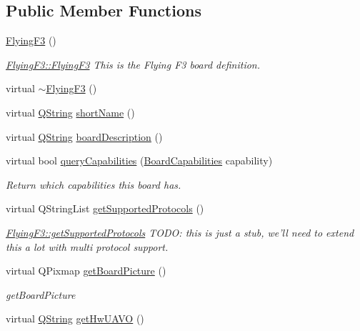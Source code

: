 \subsection*{\-Public \-Member \-Functions}
\begin{DoxyCompactItemize}
\item 
\hyperlink{group___boards___stm_ga9b44241cce2e1f0737c9fef2eace273b}{\-Flying\-F3} ()
\begin{DoxyCompactList}\small\item\em \hyperlink{group___boards___stm_ga9b44241cce2e1f0737c9fef2eace273b}{\-Flying\-F3\-::\-Flying\-F3} \-This is the \-Flying \-F3 board definition. \end{DoxyCompactList}\item 
virtual \hyperlink{group___boards___stm_ga23437724f5332cc76950a41249c6d968}{$\sim$\-Flying\-F3} ()
\item 
virtual \hyperlink{group___u_a_v_objects_plugin_gab9d252f49c333c94a72f97ce3105a32d}{\-Q\-String} \hyperlink{group___boards___stm_ga968d0cdefdfe42c8f2dfbc4cafca72f2}{short\-Name} ()
\item 
virtual \hyperlink{group___u_a_v_objects_plugin_gab9d252f49c333c94a72f97ce3105a32d}{\-Q\-String} \hyperlink{group___boards___stm_ga76b7c5c83fb46e122a100ae0ef5fae8f}{board\-Description} ()
\item 
virtual bool \hyperlink{group___boards___stm_ga92cb3b23d790b1b3aadab14c830412f3}{query\-Capabilities} (\hyperlink{group___core_plugin_ga01b09218f2a13aaeee6db007ac6bd967}{\-Board\-Capabilities} capability)
\begin{DoxyCompactList}\small\item\em \-Return which capabilities this board has. \end{DoxyCompactList}\item 
virtual \-Q\-String\-List \hyperlink{group___boards___stm_ga96db192be19ed6a7af49c8668cf4ff36}{get\-Supported\-Protocols} ()
\begin{DoxyCompactList}\small\item\em \hyperlink{group___boards___stm_ga96db192be19ed6a7af49c8668cf4ff36}{\-Flying\-F3\-::get\-Supported\-Protocols} \-T\-O\-D\-O\-: this is just a stub, we'll need to extend this a lot with multi protocol support. \end{DoxyCompactList}\item 
virtual \-Q\-Pixmap \hyperlink{group___boards___stm_ga7639046444dbf061bc2c2402d8ebc05e}{get\-Board\-Picture} ()
\begin{DoxyCompactList}\small\item\em get\-Board\-Picture \end{DoxyCompactList}\item 
virtual \hyperlink{group___u_a_v_objects_plugin_gab9d252f49c333c94a72f97ce3105a32d}{\-Q\-String} \hyperlink{group___boards___stm_gaa65745b439471a9a0c381fef5f5991c3}{get\-Hw\-U\-A\-V\-O} ()
\end{DoxyCompactItemize}


